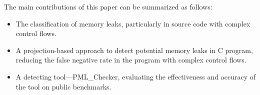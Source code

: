 The main contributions of this paper can be summarized as follows:
\begin{itemize}
\item The classification of memory leaks, particularly in source code with complex control flows.
\item A projection-based approach to detect potential memory leaks in C program, reducing the false negative rate in the program with complex control flows.
\item A detecting tool---PML\_Checker, evaluating the effectiveness and accuracy of the tool on public benchmarks. 
\end{itemize}

